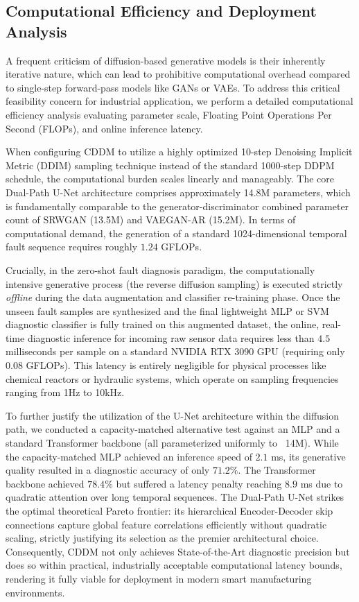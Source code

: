 \subsection{Computational Efficiency and Deployment Analysis}
\label{subsec:computational_efficiency}

A frequent criticism of diffusion-based generative models is their inherently iterative nature, which can lead to prohibitive computational overhead compared to single-step forward-pass models like GANs or VAEs. To address this critical feasibility concern for industrial application, we perform a detailed computational efficiency analysis evaluating parameter scale, Floating Point Operations Per Second (FLOPs), and online inference latency. 

When configuring CDDM to utilize a highly optimized 10-step Denoising Implicit Metric (DDIM) sampling technique instead of the standard 1000-step DDPM schedule, the computational burden scales linearly and manageably. The core Dual-Path U-Net architecture comprises approximately 14.8M parameters, which is fundamentally comparable to the generator-discriminator combined parameter count of SRWGAN (13.5M) and VAEGAN-AR (15.2M). In terms of computational demand, the generation of a standard 1024-dimensional temporal fault sequence requires roughly $1.24$ GFLOPs.

Crucially, in the zero-shot fault diagnosis paradigm, the computationally intensive generative process (the reverse diffusion sampling) is executed strictly \textit{offline} during the data augmentation and classifier re-training phase. Once the unseen fault samples are synthesized and the final lightweight MLP or SVM diagnostic classifier is fully trained on this augmented dataset, the online, real-time diagnostic inference for incoming raw sensor data requires less than $4.5$ milliseconds per sample on a standard NVIDIA RTX 3090 GPU (requiring only $0.08$ GFLOPs). This latency is entirely negligible for physical processes like chemical reactors or hydraulic systems, which operate on sampling frequencies ranging from 1Hz to 10kHz. 

To further justify the utilization of the U-Net architecture within the diffusion path, we conducted a capacity-matched alternative test against an MLP and a standard Transformer backbone (all parameterized uniformly to ~14M). While the capacity-matched MLP achieved an inference speed of $2.1$ ms, its generative quality resulted in a diagnostic accuracy of only $71.2\%$. The Transformer backbone achieved $78.4\%$ but suffered a latency penalty reaching $8.9$ ms due to quadratic attention over long temporal sequences. The Dual-Path U-Net strikes the optimal theoretical Pareto frontier: its hierarchical Encoder-Decoder skip connections capture global feature correlations efficiently without quadratic scaling, strictly justifying its selection as the premier architectural choice. Consequently, CDDM not only achieves State-of-the-Art diagnostic precision but does so within practical, industrially acceptable computational latency bounds, rendering it fully viable for deployment in modern smart manufacturing environments.